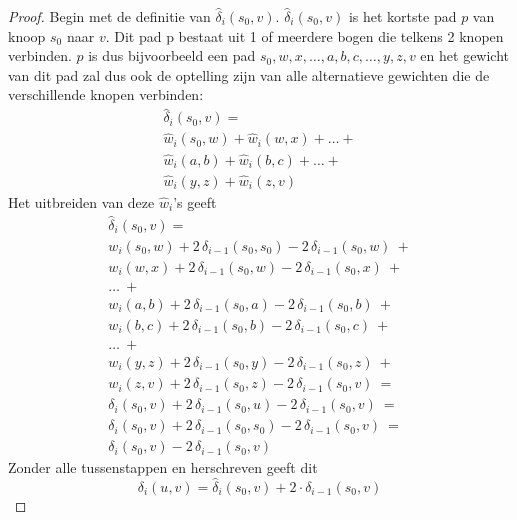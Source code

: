 \documentclass[conference]{IEEEtran}
\theoremstyle{definition}
\theoremstyle{remark}
\begin{document}
\begin{proof} \label{proof:gabow:cancel}
    Begin met de definitie van $\hat{\delta}_i(s_0, v)$. $\hat{\delta}_i(s_0, v)$ is het kortste pad $p$ van knoop $s_0$ naar $v$. Dit pad p bestaat uit 1 of meerdere bogen die telkens 2 knopen verbinden. $p$ is dus bijvoorbeeld een pad $s_0, w, x, \dots, a, b, c, \dots, y, z, v$ en het gewicht van dit pad zal dus ook de optelling zijn van alle alternatieve gewichten die de verschillende knopen verbinden:
    \begin{gather*}
        \hat{\delta}_i(s_0, v) = \\
        \hat{w}_i(s_0, w) + \hat{w}_i(w, x) + \dots + \\
        \hat{w}_i(a, b) + \hat{w}_i(b, c) + \dots + \\
        \hat{w}_i(y, z) + \hat{w}_i(z, v)
    \end{gather*}
    Het uitbreiden van deze $\hat{w}_i$'s geeft
    \begin{gather*}
        \hat{\delta}_i(s_0, v) = \\
        w_i(s_0, w) + 2\, \delta_{i-1}(s_0, s_0) - 2\, \delta_{i-1}(s_0, w)\ + \\
        w_i(w, x) + 2\, \delta_{i-1}(s_0, w) - 2\, \delta_{i-1}(s_0, x)\ + \\
        \dots\ + \\
        w_i(a, b) + 2\, \delta_{i-1}(s_0, a) - 2\, \delta_{i-1}(s_0, b)\ + \\
        w_i(b, c) + 2\, \delta_{i-1}(s_0, b) - 2\, \delta_{i-1}(s_0, c)\ + \\
        \dots\ + \\
        w_i(y, z) + 2\, \delta_{i-1}(s_0, y) - 2\, \delta_{i-1}(s_0, z)\ + \\
        w_i(z, v) + 2\, \delta_{i-1}(s_0, z) - 2\, \delta_{i-1}(s_0, v)\ = \\
        \delta_i(s_0, v) + 2\, \delta_{i-1}(s_0, u) - 2\, \delta_{i-1}(s_0, v)\ = \\
        \delta_i(s_0, v) + 2\, \delta_{i-1}(s_0, s_0) - 2\, \delta_{i-1}(s_0, v)\ = \\
        \delta_i(s_0, v) - 2\, \delta_{i-1}(s_0, v)
    \end{gather*}
    Zonder alle tussenstappen en herschreven geeft dit
    \begin{displaymath}
        \delta_i(u, v) = \hat{\delta}_i(s_0, v) + 2 \cdot \delta_{i-1}(s_0, v)
    \end{displaymath}
\end{proof}
\end{document}

